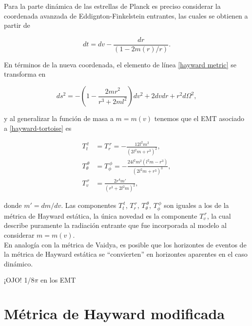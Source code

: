 \documentclass{article}
\numberwithin{equation}{section}
\theoremstyle{definition}
\begin{document}
Para la parte dinámica de las estrellas de Planck es preciso considerar la coordenada avanzada de Eddignton-Finkelstein entrantes, las cuales se obtienen a partir de

\begin{equation}
dt = dv - \frac{dr}{(1 - 2m(r)/r)}.
\end{equation}

En términos de la nueva coordenada, el elemento de línea \eqref{hayward metric} se transforma en 

\begin{equation}
\label{hayward-tortoise}
ds^2 = -\left( 1 - \frac{2mr^2}{r^3 + 2ml^2} \right) dv^2 + 2dvdr + r^2d\Omega ^2,
\end{equation}

y al generalizar la función de masa a $m = m(v)$ tenemos que el EMT asociado a \eqref{hayward-tortoise} es

\begin{equation}
\begin{aligned}
T_{t}^{\ t} &= T_{r}^{\ r} = -\frac{12 l^2 m^2}{\left(2 l^2 m+r^3\right)^2}, \\
T_{\theta}^{\ \theta} &= T_{\phi}^{\ \phi} = -\frac{24 l^2 m^2 \left(l^2 m-r^3\right)}{\left(2 l^2 m+r^3\right)^3},\\
T_{v}^{\ r} &= \frac{2r^4m'}{(r^3 + 2l^2m)^2},
\end{aligned}
\end{equation}

donde $m' = dm/dv$. Las componentes $T_{t}^{\ t}$, $T_{r}^{\ r}$, $T_{\theta}^{\ \theta}$, $T_{\phi}^{\ \phi}$ son iguales a los de la métrica de Hayward estática, la única novedad es la componente $T_{v}^{\ r}$, la cual describe puramente la radiación entrante que fue incorporada al modelo al considerar $m = m(v)$.\\

En analogía con la métrica de Vaidya, es posible que los horizontes de eventos de la métrica de Hayward estática se ``convierten'' en horizontes aparentes en el caso dinámico. 

¡OJO! 1/8$\pi$ en los EMT

\section{Métrica de Hayward modificada}
\end{document}
